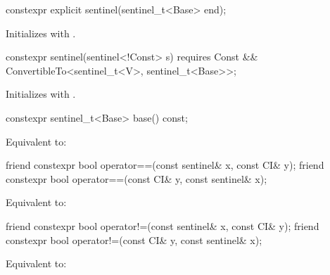 \begin{itemdecl}
constexpr explicit sentinel(sentinel_t<Base> end);
\end{itemdecl}

\begin{itemdescr}
\pnum
\effects Initializes  with .
\end{itemdescr}

%
\begin{itemdecl}
constexpr sentinel(sentinel<!Const> s)
  requires Const && ConvertibleTo<sentinel_t<V>, sentinel_t<Base>>;
\end{itemdecl}

\begin{itemdescr}
\pnum
\effects Initializes  with .
\end{itemdescr}

\begin{itemdecl}
constexpr sentinel_t<Base> base() const;
\end{itemdecl}

\begin{itemdescr}
\pnum
\effects Equivalent to: 
\end{itemdescr}

\begin{itemdecl}
friend constexpr bool operator==(const sentinel& x, const CI& y);
friend constexpr bool operator==(const CI& y, const sentinel& x);
\end{itemdecl}

\begin{itemdescr}
\pnum
\effects Equivalent to:
\end{itemdescr}

%
\begin{itemdecl}
friend constexpr bool operator!=(const sentinel& x, const CI& y);
friend constexpr bool operator!=(const CI& y, const sentinel& x);
\end{itemdecl}

\begin{itemdescr}
\pnum
\effects Equivalent to: 
\end{itemdescr}

